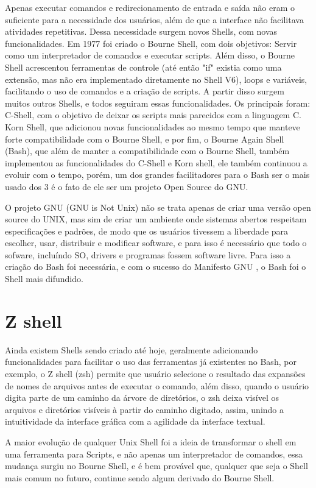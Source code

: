 \documentclass[oneside, 11 pt]{article}
\begin{document}
	Apenas executar comandos e redirecionamento de entrada e saída não eram o suficiente para a necessidade dos usuários, além de que a interface não facilitava atividades repetitivas. Dessa necessidade surgem novos Shells, com novas funcionalidades. Em 1977 foi criado o Bourne Shell, com dois objetivos: Servir como um interpretador de comandos e executar scripts. Além disso, o Bourne Shell acrescentou ferramentas de controle (até então "if" existia como uma extensão, mas não era implementado diretamente no Shell V6), loops e variáveis, facilitando o uso de comandos e a criação de scripts. A partir disso surgem muitos outros Shells, e todos seguiram essas funcionalidades. Os principais foram: C-Shell, com o objetivo de deixar os scripts mais parecidos com a linguagem C. Korn Shell, que adicionou novas funcionalidades ao mesmo tempo que manteve forte compatibilidade com o Bourne Shell, e por fim, o Bourne Again Shell (Bash), que além de manter a compatibilidade com o Bourne Shell, também implementou as funcionalidades do C-Shell e Korn shell, ele também continuou a evoluir com o tempo, porém, um dos grandes facilitadores para o Bash ser o mais usado dos 3 é o fato de ele ser um projeto Open Source do GNU.
	
	O projeto GNU (GNU is Not Unix) não se trata apenas de criar uma versão open source do UNIX, mas sim de criar um ambiente onde sistemas abertos respeitam especificações e padrões, de modo que os usuários tivessem a liberdade para escolher, usar, distribuir e modificar software, e para isso é necessário que todo o sofware, incluíndo SO, drivers e programas fossem software livre. Para isso a criação do Bash foi necessária, e com o sucesso do Manifesto GNU \cite{gnu}, o Bash foi o Shell mais difundido.
	
	\section{Z shell}	
	Ainda existem Shells sendo criado até hoje, geralmente adicionando funcionalidades para facilitar o uso das ferramentas já existentes no Bash, por exemplo, o Z shell (zsh) permite que usuário selecione o resultado das expansões de nomes de arquivos antes de executar o comando, além disso, quando o usuário digita parte de um caminho da árvore de diretórios, o zsh deixa visível os arquivos e diretórios visíveis à partir do caminho digitado, assim, unindo a intuitividade da interface gráfica com a agilidade da interface textual. 
	
	A maior evolução de qualquer Unix Shell foi a ideia de transformar o shell em uma ferramenta para Scripts, e não apenas um interpretador de comandos, essa mudança surgiu no Bourne Shell, e é bem provável que, qualquer que seja o Shell mais comum no futuro, continue sendo algum derivado do Bourne Shell.
	
\end{document}
